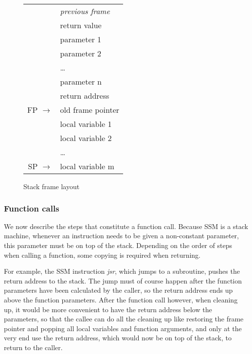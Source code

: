 \documentclass[a4paper]{article}
\newcommand{\arr}{\rightarrow}
\begin{document}
\begin{figure}[h]
\begin{center}
\begin{tabular}{r|l|}
  & \emph{previous frame} \\
  \cline{2-2}
  & return value \\
  \cline{2-2}
  & parameter 1 \\
  \cline{2-2}
  & parameter 2 \\
  \cline{2-2}
  & \ldots \\
  \cline{2-2}
  & parameter n \\
  \cline{2-2}
  & return address \\
  \cline{2-2}
  FP $\arr$ & old frame pointer \\
  \cline{2-2}
  & local variable 1 \\
  \cline{2-2}
  & local variable 2 \\
  \cline{2-2}
  & \ldots \\
  \cline{2-2}
  SP $\arr$ & local variable m \\
  \cline{2-2}
\end{tabular}
\end{center}
\caption{Stack frame layout}
\label{fig_stackLayout}
\end{figure}

\subsubsection{Function calls}

We now describe the steps that constitute a function call.  Because SSM is a
stack machine, whenever an instruction needs to be given a non-constant
parameter, this parameter must be on top of the stack.  Depending on the order
of steps when calling a function, some copying is required when
returning.

For example, the SSM instruction \emph{jsr}, which jumps to a subroutine, pushes
the return address to the stack.  The jump must of course happen after the
function parameters have been calculated by the caller, so the return address
ends up above the function parameters.  After the function call however, when
cleaning up, it would be more convenient to have the return address below the
parameters, so that the callee can do all the cleaning up like restoring the
frame pointer and popping all local variables and function arguments, and only
at the very end use the return address, which would now be on top of the stack,
to return to the caller.
\end{document}
